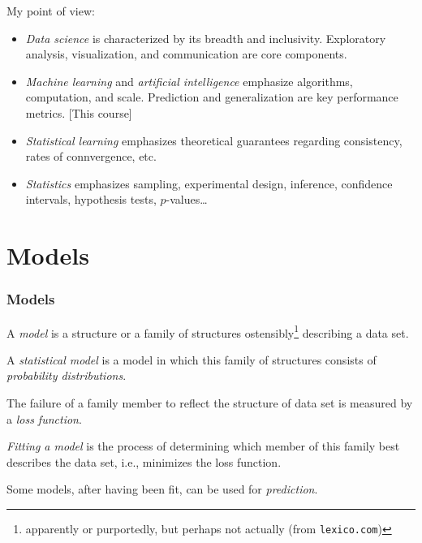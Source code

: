 \documentclass[xcolor={dvipsnames}]{beamer}
\newcommand{\RR}{\mathbb{R}}
\begin{document}
\begin{frame}
    \setlength\parskip{1em}
    My point of view:
    
    \begin{itemize}
        \setlength\parskip{1em}
        \item \emph{Data science} is characterized by its breadth and inclusivity.
        Exploratory analysis, visualization, and communication are core components.
        \item \emph{Machine learning} and \emph{artificial intelligence} emphasize algorithms, computation, and scale. Prediction and generalization are key performance metrics.
        [This course]
        \item \emph{Statistical learning} emphasizes theoretical guarantees regarding consistency, rates of connvergence, etc.
        \item \emph{Statistics} emphasizes sampling, experimental design, inference, confidence intervals, hypothesis tests, $p$-values\ldots
    \end{itemize}
\end{frame}

\section[Models]{Models}

\begin{frame}
    \setlength\parskip{1em}
    \frametitle{Models}

    A \emph{model} is a structure or a family of structures ostensibly\footnote{apparently or purportedly, but perhaps not actually (from \texttt{lexico.com})} describing a data set.

    A \emph{statistical model} is a model in which this family of structures consists of \emph{probability distributions}.

    The failure of a family member to reflect the structure of data set is measured by a \emph{loss function}.

    \emph{Fitting a model} is the process of determining which member of this family best describes the data set, i.e., minimizes the loss function.

    Some models, after having been fit, can be used for \emph{prediction}.
\end{frame}


\end{document}
